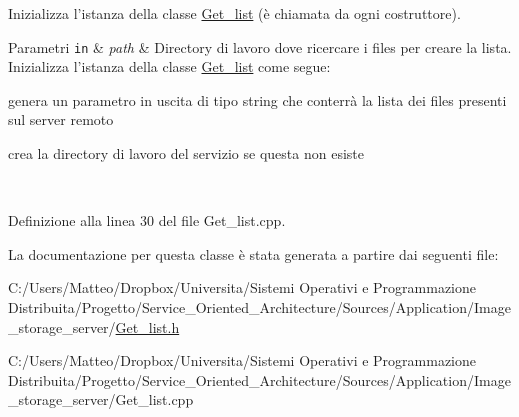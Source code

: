Inizializza l'istanza della classe \hyperlink{class_get__list}{Get\-\_\-list} (è chiamata da ogni costruttore). 


\begin{DoxyParams}[1]{Parametri}
\mbox{\tt in}  & {\em path} & Directory di lavoro dove ricercare i files per creare la lista. Inizializza l'istanza della classe \hyperlink{class_get__list}{Get\-\_\-list} come segue\-: \begin{DoxyItemize}
\item genera un parametro in uscita di tipo {\ttfamily string} che conterrà la lista dei files presenti sul server remoto \item crea la directory di lavoro del servizio se questa non esiste \end{DoxyItemize}
\\
\hline
\end{DoxyParams}


Definizione alla linea 30 del file Get\-\_\-list.\-cpp.



La documentazione per questa classe è stata generata a partire dai seguenti file\-:\begin{DoxyCompactItemize}
\item 
C\-:/\-Users/\-Matteo/\-Dropbox/\-Universita/\-Sistemi Operativi e Programmazione Distribuita/\-Progetto/\-Service\-\_\-\-Oriented\-\_\-\-Architecture/\-Sources/\-Application/\-Image\-\_\-storage\-\_\-server/\hyperlink{_get__list_8h}{Get\-\_\-list.\-h}\item 
C\-:/\-Users/\-Matteo/\-Dropbox/\-Universita/\-Sistemi Operativi e Programmazione Distribuita/\-Progetto/\-Service\-\_\-\-Oriented\-\_\-\-Architecture/\-Sources/\-Application/\-Image\-\_\-storage\-\_\-server/Get\-\_\-list.\-cpp\end{DoxyCompactItemize}

